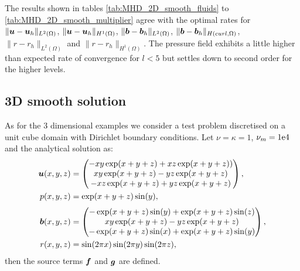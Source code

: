 The results shown in tables \ref{tab:MHD_2D_smooth_fluids} to \ref{tab:MHD_2D_smooth_multiplier} agree with the optimal rates for $\|\boldsymbol u-\boldsymbol u_h\|_{L^2(\Omega)}$, $\|\boldsymbol u-\boldsymbol u_h\|_{H^1(\Omega)}$, $\|\boldsymbol b-\boldsymbol b_h\|_{L^2(\Omega)}$, $\|\boldsymbol b-\boldsymbol b_h\|_{H(curl,\Omega)}$, $\|{r}-{r}_h\|_{L^2(\Omega)}$ and $\|{r}-{r}_h\|_{H^1(\Omega)}$. The pressure field  exhibits a little higher than expected rate of convergence for $l<5$ but settles down to second order for the higher levels.





\subsection{3D smooth solution}

As for the 3 dimensional examples we consider a test problem discretised on a unit cube domain with Dirichlet boundary conditions. Let $\nu = \kappa =1$, $\nu_m=\rm{1e4}$ and the analytical solution as:
\begin{align*} \nonumber
\boldsymbol u(x,y,z)& =\begin{pmatrix}
-xy\exp(x + y + z) + xz\exp(x + y + z))\\
xy\exp(x + y + z) - yz\exp(x + y + z)\\
-xz\exp(x + y + z) + yz\exp(x + y + z)
\end{pmatrix},\\
p(x,y,z)& =\exp(x + y + z)\sin(y),\\[0.1cm]
\boldsymbol b(x,y,z)& =\begin{pmatrix}
 -\exp(x + y + z)\sin(y) + \exp(x + y + z)\sin(z) \\
xy\exp(x + y + z) - yz\exp(x + y + z) \\
-\exp(x + y + z)\sin(x) + \exp(x + y + z)\sin(y)
\end{pmatrix},\\
 r(x,y,z)& =\sin(2\pi x)\sin(2\pi y)\sin(2\pi z),
\end{align*}
then the source terms $\boldsymbol f$ and $\boldsymbol g$ are defined.

